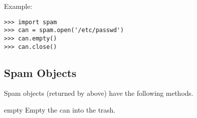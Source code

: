 Example:

\begin{verbatim}
>>> import spam
>>> can = spam.open('/etc/passwd')
>>> can.empty()
>>> can.close()
\end{verbatim}
%

\subsection{Spam Objects}

Spam objects (returned by  above) have the following
methods.


\begin{funcdesc}{empty}{}
Empty the can into the trash.
\end{funcdesc}

